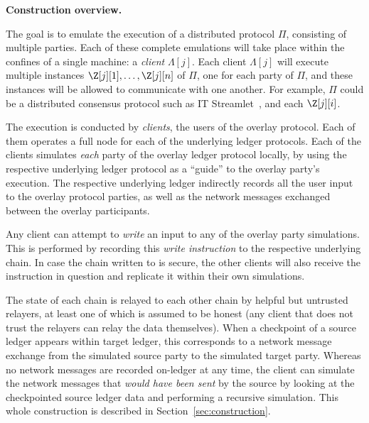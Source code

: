 \noindent
\textbf{Construction overview.}

The goal is to emulate the execution of a distributed protocol $\Pi$,
consisting of multiple parties. Each of these complete emulations will take place
within the confines of a single machine: a \emph{\rollerblade client} $\Lambda[j]$.
Each \rollerblade client $\Lambda[j]$ will execute multiple instances $\Z[j][1], \ldots, \Z[j][n]$
of $\Pi$, one for each party of $\Pi$, and these instances will be allowed to communicate
with one another. For example, $\Pi$ could be a distributed consensus protocol such as
IT Streamlet~\cite{it-streamlet}, and each $\Z[j][i]$.

The execution is conducted by \emph{\rollerblade clients},
the users of the overlay protocol.
Each of them operates a full node for each of the underlying ledger protocols.
Each of the \rollerblade clients simulates \emph{each} party of the overlay
ledger protocol locally, by using the respective underlying ledger protocol
as a ``guide'' to the overlay party's execution.
The respective underlying ledger indirectly records all the
user input to the overlay protocol parties, as well as the network
messages exchanged between the overlay participants.

Any \rollerblade client can attempt to \emph{write} an input to any
of the overlay party simulations. This is performed by recording this
\emph{write instruction} to the respective underlying chain. In case
the chain written to is secure, the other \rollerblade clients will
also receive the instruction in question and replicate it within their
own simulations.

The
state of each chain is relayed to each other chain by helpful but
untrusted relayers, at least one of which is assumed to be honest
(any \rollerblade client that does not trust the relayers can relay
the data themselves). When a checkpoint of a source ledger
appears within target ledger, this corresponds to a network message
exchange from the simulated source party to the simulated target party.
Whereas no network messages are recorded on-ledger at any time,
the \rollerblade client can simulate the network messages that
\emph{would have been sent} by the source by looking at the checkpointed
source ledger data and performing a recursive simulation.
This whole construction is described in Section~\ref{sec:construction}.


